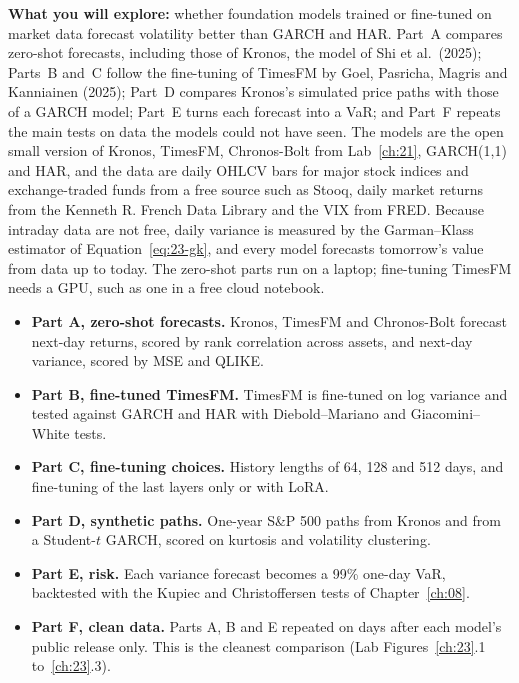 \textbf{What you will explore:} whether foundation models trained or fine-tuned on market data forecast volatility better than GARCH and HAR. Part~A compares zero-shot forecasts, including those of Kronos, the model of Shi et al.\ (2025); Parts~B and~C follow the fine-tuning of TimesFM by Goel, Pasricha, Magris and Kanniainen (2025); Part~D compares Kronos's simulated price paths with those of a GARCH model; Part~E turns each forecast into a VaR; and Part~F repeats the main tests on data the models could not have seen. The models are the open small version of Kronos, TimesFM, Chronos-Bolt from Lab~\ref{ch:21}, GARCH(1,1) and HAR, and the data are daily OHLCV bars for major stock indices and exchange-traded funds from a free source such as Stooq, daily market returns from the Kenneth R. French Data Library and the VIX from FRED. Because intraday data are not free, daily variance is measured by the Garman--Klass estimator of Equation~\eqref{eq:23-gk}, and every model forecasts tomorrow's value from data up to today. The zero-shot parts run on a laptop; fine-tuning TimesFM needs a GPU, such as one in a free cloud notebook.

\begin{itemize}
  \item \textbf{Part A, zero-shot forecasts.} Kronos, TimesFM and Chronos-Bolt forecast next-day returns, scored by rank correlation across assets, and next-day variance, scored by MSE and QLIKE.
  \item \textbf{Part B, fine-tuned TimesFM.} TimesFM is fine-tuned on log variance and tested against GARCH and HAR with Diebold--Mariano and Giacomini--White tests.
  \item \textbf{Part C, fine-tuning choices.} History lengths of 64, 128 and 512 days, and fine-tuning of the last layers only or with LoRA.
  \item \textbf{Part D, synthetic paths.} One-year S\&P 500 paths from Kronos and from a Student-$t$ GARCH, scored on kurtosis and volatility clustering.
  \item \textbf{Part E, risk.} Each variance forecast becomes a 99\% one-day VaR, backtested with the Kupiec and Christoffersen tests of Chapter~\ref{ch:08}.
  \item \textbf{Part F, clean data.} Parts A, B and E repeated on days after each model's public release only. This is the cleanest comparison (Lab Figures~\ref{ch:23}.1 to~\ref{ch:23}.3).
\end{itemize}

